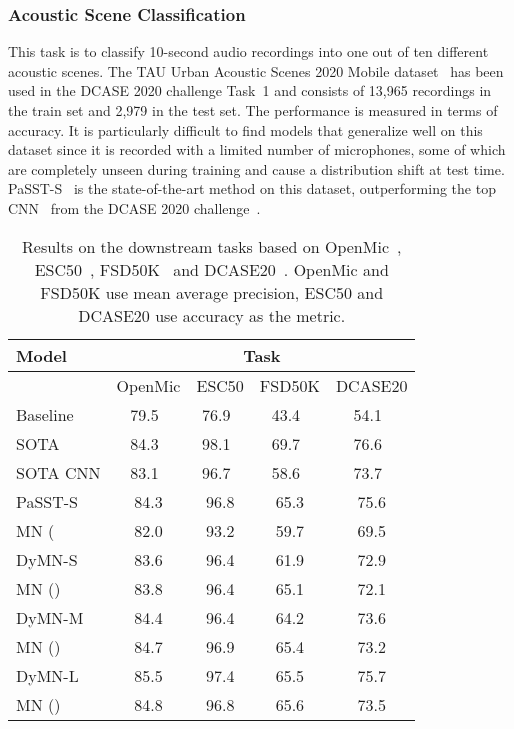 \documentclass[lettersize,journal]{IEEEtran}
\begin{document}
\subsubsection{Acoustic Scene Classification}

This task is to classify 10-second audio recordings into one out of ten different acoustic scenes. The TAU Urban Acoustic Scenes 2020 Mobile dataset~\cite{heittola2020acoustic} has been used in the DCASE 2020 challenge \mbox{Task 1} and consists of 13,965 recordings in the train set and 2,979 in the test set. The performance is measured in terms of accuracy. It is particularly difficult to find models that generalize well on this dataset since it is recorded with a limited number of microphones, some of which are completely unseen during training and cause a distribution shift at test time. PaSST-S~\cite{Koutini21Passt} is the state-of-the-art method on this dataset, outperforming the top CNN~\cite{suh2020designing} from the DCASE 2020 challenge~\cite{heittola2020acoustic}.

\begin{table}[t]
\caption{
 Results on the downstream tasks based on OpenMic~\cite{humphrey2018openmic}, ESC50~\cite{piczak2015esc}, FSD50K~\cite{fonseca2021fsd50k} and DCASE20~\cite{heittola2020acoustic}. OpenMic and FSD50K use mean average precision, ESC50 and DCASE20 use accuracy as the metric.
}
\begin{tabular}{l|cccc}
   \textbf{Model}  &  \multicolumn{4}{c}{\textbf{Task}} \\ 
   
   \midrule
   
   & OpenMic & ESC50 & FSD50K & DCASE20 \\
     
      \midrule
Baseline & 79.5~\cite{humphrey2018openmic} & 76.9~\cite{piczak2015esc} & 43.4~\cite{fonseca2021fsd50k} & 54.1~\cite{heittola2020acoustic} \\
SOTA & 84.3~\cite{Koutini21Passt} & 98.1~\cite{chen2022beats} & 69.7~\cite{wang2023one} & 76.6~\cite{morocutti2023device} \\
SOTA CNN & 83.1~\cite{Koutini21Receptive} & 96.7~\cite{elizalde2023clap} & 58.6~\cite{elizalde2023clap} & 73.7~\cite{suh2020designing} \\
PaSST-S & 84.3 & 96.8 & 65.3 & 75.6 \\
\midrule
MN ( & 82.0 & 93.2 & 59.7 & 69.5 \\
DyMN-S & 83.6 & 96.4 & 61.9 & 72.9 \\
\midrule
MN () & 83.8 & 96.4 & 65.1 & 72.1 \\
DyMN-M & 84.4 & 96.4 & 64.2 & 73.6 \\
\midrule
MN () & 84.7 & 96.9 & 65.4 & 73.2\\
DyMN-L & 85.5 & 97.4 & 65.5 & 75.7\\ \midrule
MN () & 84.8 & 96.8 & 65.6 & 73.5 \\
\bottomrule
\end{tabular}
\label{tab:results_downstream}
\end{table}
\end{document}
